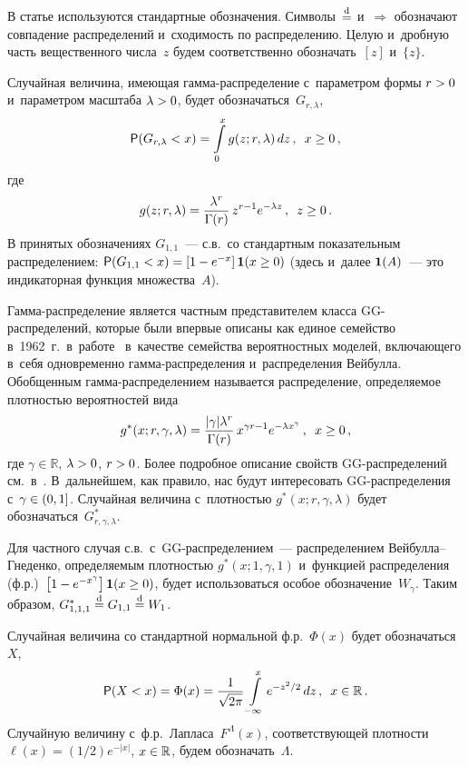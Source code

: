 \begin{multicols}{2}
В статье используются стандартные обозначения. Символы~$\stackrel{\mathrm{d}}{=}$ 
и~$\Longrightarrow$ обозначают совпадение распределений и~сходимость
по распределению. Целую и~дробную часть вещественного числа~$z$
будем соответственно обозначать~$[z]$ и~$\{z\}$.

Случайная величина, имеющая гам\-ма-рас\-пре\-де\-ле\-ние с~параметром формы $r\hm>0$ 
и~параметром масштаба $\lambda\hm>0$, будет обозначаться~$G_{r,\lambda}$,
$$
{\sf P}(G_{r,\lambda}<x)=\int\limits_{0}^{x}g(z;r,\lambda)\,dz\,,\enskip x\ge0\,,
$$
где
$$
g(z;r,\lambda)=\displaystyle\frac{\displaystyle \lambda^r\mathstrut}{\displaystyle \Gamma(r)\mathstrut}\,z^{r-1}e^{-\lambda z}\,,\enskip
z\ge0\,.
$$
В принятых обозначениях $G_{1,1}$~--- с.в.\ со стандартным
показательным распределением: ${\sf P}
(G_{1,1}\hm<x)=\left[1-e^{-x}\right]{\bf 1}(x\hm\ge0)$ (здесь и~далее ${\bf 1}(A)$~--- 
это индикаторная функция множества~$A$).

Гамма-распределение является частным представителем класса
GG-рас\-пре\-де\-ле\-ний, которые были впервые описаны как единое семейство 
в~1962~г.\ в~работе~\cite{Stacy1962} в~качестве семейства веро\-ятностных
моделей, включающего в~себя одновременно гам\-ма-рас\-пре\-де\-ле\-ния 
и~распределения \mbox{Вейбулла}. Обобщенным гам\-ма-рас\-пре\-де\-ле\-ни\-ем называется
распределение, определяемое плот\-ностью вероятностей вида
$$
g^*(x;r,\gamma,\lambda)=\displaystyle\frac{\displaystyle |\gamma|\lambda^r\mathstrut}{\displaystyle \Gamma(r)\mathstrut}\,x^{\gamma
r-1}e^{-\lambda x^{\gamma}}\,,\enskip x\ge0\,,
$$
где $\gamma\in\mathbb{R}$, $\lambda\hm>0$, $r\hm>0$. Более подробное
описание свойств GG-рас\-пре\-де\-ле\-ний см.\ в~\cite{Stacy1962, KorolevZaks2013}. 
В~дальнейшем, как правило, нас будут интересовать
GG-рас\-пре\-де\-ле\-ния с~$\gamma\hm\in(0,1]$. Случайная величина с~плот\-ностью
$g^*(x;r,\gamma,\lambda)$ будет обозначаться~$G^*_{r,\gamma,\lambda}$.

Для частного случая с.в.\ с~GG-рас\-пре\-де\-ле\-нием~--- распределением
Вей\-бул\-ла--Гне\-ден\-ко, определяемым плотностью $g^*(x;1,\gamma,1)$ 
и~функцией распреде\-ления (ф.р.)\ $\left[1-e^{-x^{\gamma}}\right]{\bf 1}(x\hm\ge0)$, будет
использоваться особое обозначение~$W_{\gamma}$. Таким образом,
$G^*_{1,1,1}\stackrel{\mathrm{d}}{=} G_{1,1}\stackrel{\mathrm{d}}{=} W_1$.

Случайная величина со стандартной нормальной ф.р.~$\Phi(x)$ будет обозначаться~$X$,
$$
{\sf P}(X<x)=\Phi(x)=\displaystyle\frac{\displaystyle 1\mathstrut}{\displaystyle \sqrt{2\pi}\mathstrut}\int\limits_{-\infty}^{x}e^{-z^2/2}\,dz\,,\enskip
x\in\mathbb{R}\,.
$$
Случайную величину с~ф.р.\ Лапласа~$F^{\Lambda}(x)$, соответствующей
плотности $\ell(x)=(1/2)e^{-|x|}$, $x\hm\in\mathbb{R}$,
будем обозначать~$\Lambda$.


\end{multicols}
